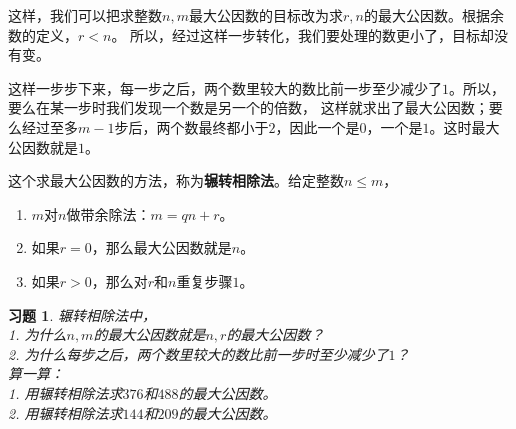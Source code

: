 \documentclass[12pt,UTF8]{ctexbook}
\newtheorem{xt}{习题}[section]
\begin{document}
这样，我们可以把求整数$n,m$最大公因数的目标改为求$r,n$的最大公因数。根据余数的定义，$r < n$。
所以，经过这样一步转化，我们要处理的数更小了，目标却没有变。

这样一步步下来，每一步之后，两个数里较大的数比前一步至少减少了$1$。所以，要么在某一步时我们发现一个数是另一个的倍数，
这样就求出了最大公因数；要么经过至多$m-1$步后，两个数最终都小于$2$，因此一个是$0$，一个是$1$。这时最大公因数就是$1$。

这个求最大公因数的方法，称为\textbf{辗转相除法}。给定整数$n\leqslant m$，
\begin{enumerate}
    \item $m$对$n$做带余除法：$m = q n + r$。
    \item 如果$r = 0$，那么最大公因数就是$n$。
    \item 如果$r > 0$，那么对$r$和$n$重复步骤$1$。
\end{enumerate}

\begin{xt}\label{xt:5-2-0}
    辗转相除法中，\\
    1. 为什么$n,m$的最大公因数就是$n,r$的最大公因数？\\
    2. 为什么每步之后，两个数里较大的数比前一步时至少减少了$1$？\\
    算一算：\\
    1. 用辗转相除法求$376$和$488$的最大公因数。\\
    2. 用辗转相除法求$144$和$209$的最大公因数。
\end{xt}
\end{document}
